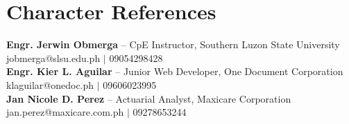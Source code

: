 \documentclass[letterpaper,11pt]{article}
\begin{document}
\section{Character References}
 \begin{itemize}[leftmargin=0.15in, label={}]
    \small{\item{
     \textbf{Engr. Jerwin Obmerga} -- CpE Instructor, Southern Luzon State University \\
     jobmerga@slsu.edu.ph $|$ 09054298428 \\[4pt]
     \textbf{Engr. Kier L. Aguilar} -- Junior Web Developer, One Document Corporation \\
     klaguilar@onedoc.ph $|$ 09606023995 \\[4pt]
     \textbf{Jan Nicole D. Perez} -- Actuarial Analyst, Maxicare Corporation \\
     jan.perez@maxicare.com.ph $|$ 09278653244
    }}
 \end{itemize}
\end{document}
